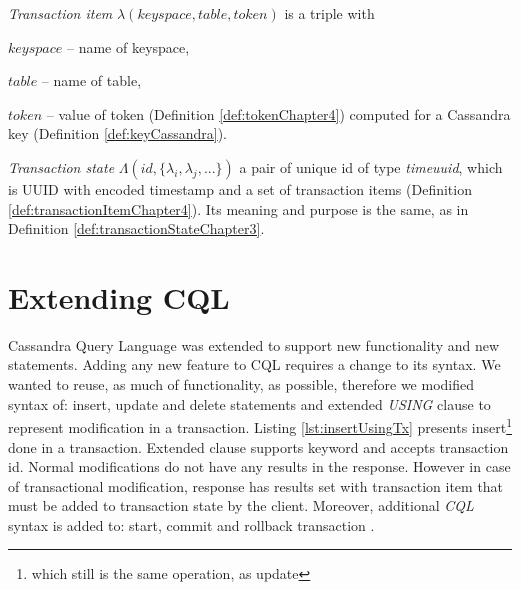 \begin{definition}
\label{def:transactionItemChapter4}
\emph{Transaction item} $\lambda(\mathit{keyspace}, \mathit{table}, \mathit{token})$ is a triple with \begin{enumerate*}[label=\alph*)]
\item $\mathit{keyspace}$ -- name of keyspace,
\item $\mathit{table}$ -- name of table,
\item $\mathit{token}$ -- value of token (Definition \ref{def:tokenChapter4}) computed for a Cassandra key (Definition \ref{def:keyCassandra}).
\end{enumerate*}
\end{definition}

\begin{definition}
\label{def:transactionStateChapter4}
\emph{Transaction state} $\Lambda(\mathit{id}, \{\lambda_{i}, \lambda_{j}, ...\})$ a pair of unique id of type \emph{timeuuid}, which is UUID with encoded timestamp \cite{CassandraUUID} and a set of transaction items (Definition \ref{def:transactionItemChapter4}). Its meaning and purpose is the same, as in Definition \ref{def:transactionStateChapter3}.
\end{definition}






\section{Extending CQL}
Cassandra Query Language was extended to support new functionality and new statements. Adding any new feature to CQL requires a change to its syntax. We wanted to reuse, as much of functionality, as possible, therefore we modified syntax of: insert, update and delete statements and extended \emph{USING} clause to represent modification in a transaction. Listing \ref{lst:insertUsingTx} presents insert\footnote{which still is the same operation, as update} done in a transaction. Extended  clause supports  keyword and accepts transaction id. Normal modifications do not have any results in the response. However in case of transactional modification, response has results set with transaction item that must be added to transaction state by the client. Moreover, additional \emph{CQL} syntax is added to: start, commit and rollback transaction \transaction.

